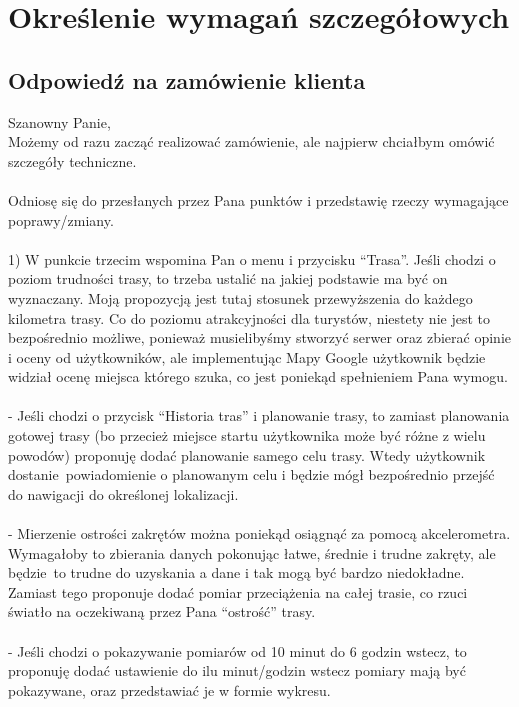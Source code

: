 	\newpage
\section{Określenie wymagań szczegółowych}		%
\subsection{Odpowiedź na zamówienie klienta}  %

\hspace{1cm}
Szanowny Panie,\\
Możemy od razu zacząć realizować zamówienie, ale najpierw chciałbym omówić szczegóły techniczne. \\\\
Odniosę się do przesłanych przez Pana punktów i przedstawię rzeczy wymagające poprawy/zmiany.\\\\
1) W punkcie trzecim wspomina Pan o menu i przycisku ``Trasa''. Jeśli chodzi o poziom trudności trasy, to trzeba ustalić na jakiej podstawie ma być on wyznaczany. Moją propozycją jest tutaj stosunek przewyższenia do każdego kilometra trasy. Co do poziomu atrakcyjności dla turystów, niestety nie jest to bezpośrednio możliwe, ponieważ musielibyśmy stworzyć serwer oraz zbierać opinie i oceny od użytkowników, ale implementując Mapy Google użytkownik będzie widział ocenę miejsca którego szuka, co jest poniekąd spełnieniem Pana wymogu. \\\\
- Jeśli chodzi o przycisk ``Historia tras'' i planowanie trasy, to zamiast planowania gotowej trasy (bo przecież miejsce startu użytkownika może być różne z wielu powodów) proponuję dodać planowanie samego celu trasy. Wtedy użytkownik dostanie~powiadomienie o planowanym celu i będzie mógł bezpośrednio przejść do nawigacji do określonej lokalizacji. \\\\
- Mierzenie ostrości zakrętów można poniekąd osiągnąć za pomocą akcelerometra. Wymagałoby to zbierania danych pokonując łatwe, średnie i trudne zakręty, ale będzie~to trudne do uzyskania a dane i tak mogą być bardzo niedokładne. Zamiast tego proponuje dodać pomiar przeciążenia na całej trasie, co rzuci światło na oczekiwaną przez Pana ``ostrość'' trasy. \\\\
- Jeśli chodzi o pokazywanie pomiarów od 10 minut do 6 godzin wstecz, to proponuję dodać ustawienie do ilu minut/godzin wstecz pomiary mają być pokazywane, oraz przedstawiać je w formie wykresu. \\\\

